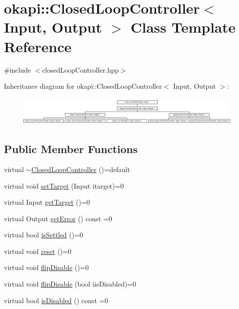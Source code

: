 \hypertarget{classokapi_1_1ClosedLoopController}{}\section{okapi\+::Closed\+Loop\+Controller$<$ Input, Output $>$ Class Template Reference}
\label{classokapi_1_1ClosedLoopController}


{\ttfamily \#include $<$closed\+Loop\+Controller.\+hpp$>$}

Inheritance diagram for okapi\+::Closed\+Loop\+Controller$<$ Input, Output $>$\+:\begin{figure}[H]
\begin{center}
\leavevmode
\includegraphics[height=1.493333cm]{classokapi_1_1ClosedLoopController}
\end{center}
\end{figure}
\subsection*{Public Member Functions}
\begin{DoxyCompactItemize}
\item 
virtual \mbox{\hyperlink{classokapi_1_1ClosedLoopController_a7fa88d53b8f248e0894b8e0865918d5b}{$\sim$\+Closed\+Loop\+Controller}} ()=default
\item 
virtual void \mbox{\hyperlink{classokapi_1_1ClosedLoopController_ac14482d0768b3f157d52e0214a4c36d7}{set\+Target}} (Input itarget)=0
\item 
virtual Input \mbox{\hyperlink{classokapi_1_1ClosedLoopController_a22012bedbfaff6e5a3a508f274ec2497}{get\+Target}} ()=0
\item 
virtual Output \mbox{\hyperlink{classokapi_1_1ClosedLoopController_a50c73444ff6e3e631951c43d0f951953}{get\+Error}} () const =0
\item 
virtual bool \mbox{\hyperlink{classokapi_1_1ClosedLoopController_aed7aa0e94b6474c28314f8517d6cb4d8}{is\+Settled}} ()=0
\item 
virtual void \mbox{\hyperlink{classokapi_1_1ClosedLoopController_a7dd6ce28b3e38bdf987514a1b6c83c8c}{reset}} ()=0
\item 
virtual void \mbox{\hyperlink{classokapi_1_1ClosedLoopController_a9de69b60885df41cd2164fe1a23f34d3}{flip\+Disable}} ()=0
\item 
virtual void \mbox{\hyperlink{classokapi_1_1ClosedLoopController_a768cd1db40ce9cd5c89b20be6e838ccc}{flip\+Disable}} (bool iis\+Disabled)=0
\item 
virtual bool \mbox{\hyperlink{classokapi_1_1ClosedLoopController_a40bd4ec2b8c75503fbf6f494fd7cbe69}{is\+Disabled}} () const =0
\end{DoxyCompactItemize}


